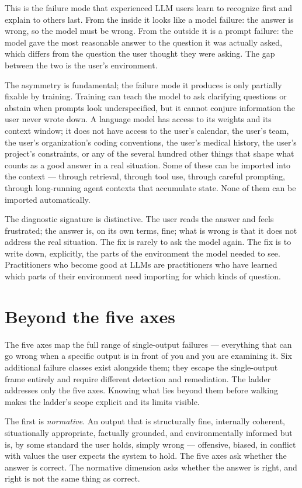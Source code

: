 \documentclass[11pt,a4paper]{article}
\begin{document}
This is the failure mode that experienced LLM users learn to
recognize first and explain to others last. From the inside it
looks like a model failure: the answer is wrong, so the model must
be wrong. From the outside it is a prompt failure: the model gave
the most reasonable answer to the question it was actually asked,
which differs from the question the user thought they were asking.
The gap between the two is the user's environment.

The asymmetry is fundamental; the failure mode it produces is
only partially fixable by training. Training can teach the model
to ask clarifying questions or abstain when prompts look
underspecified, but it cannot conjure information the user never
wrote down. A language model has access to its weights and its
context window; it does not have access to the user's calendar, the user's team,
the user's organization's coding conventions, the user's medical
history, the user's project's constraints, or any of the several
hundred other things that shape what counts as a good answer in a
real situation. Some of these can be imported into the context
--- through retrieval, through tool use, through careful prompting,
through long-running agent contexts that accumulate state. None of
them can be imported automatically.

The diagnostic signature is distinctive. The user reads the answer
and feels frustrated; the answer is, on its own terms, fine; what
is wrong is that it does not address the real situation. The fix
is rarely to ask the model again. The fix is to write down,
explicitly, the parts of the environment the model needed to see.
Practitioners who become good at LLMs are practitioners who have
learned which parts of their environment need importing for which
kinds of question.

\section*{Beyond the five axes}

The five axes map the full range of single-output failures ---
everything that can go wrong when a specific output is in front
of you and you are examining it. Six additional failure classes
exist alongside them; they escape the single-output frame
entirely and require different detection and remediation. The
ladder addresses only the five axes. Knowing what lies beyond
them before walking makes the ladder's scope explicit and its
limits visible.

The first is \emph{normative}. An output that is structurally
fine, internally coherent, situationally appropriate, factually
grounded, and environmentally informed but is, by some standard
the user holds, simply wrong --- offensive, biased, in conflict
with values the user expects the system to hold. The five axes
ask whether the answer is correct. The normative dimension asks
whether the answer is right, and right is not the same thing as
correct.
\end{document}
